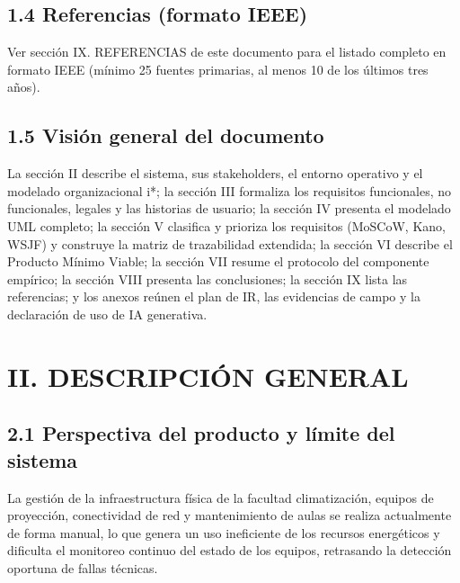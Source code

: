\subsection*{1.4 Referencias (formato IEEE)}


Ver sección IX. REFERENCIAS de este documento para el listado completo en formato IEEE (mínimo 25 fuentes primarias, al menos 10 de los últimos tres años).


\subsection*{1.5 Visión general del documento}


La sección II describe el sistema, sus stakeholders, el entorno operativo y el modelado organizacional i*; la sección III formaliza los requisitos funcionales, no funcionales, legales y las historias de usuario; la sección IV presenta el modelado UML completo; la sección V clasifica y prioriza los requisitos (MoSCoW, Kano, WSJF) y construye la matriz de trazabilidad extendida; la sección VI describe el Producto Mínimo Viable; la sección VII resume el protocolo del componente empírico; la sección VIII presenta las conclusiones; la sección IX lista las referencias; y los anexos reúnen el plan de IR, las evidencias de campo y la declaración de uso de IA generativa.


\section*{II. DESCRIPCIÓN GENERAL}


\subsection*{2.1 Perspectiva del producto y límite del sistema}


La gestión de la infraestructura física de la facultad climatización, equipos de proyección, conectividad de red y mantenimiento de aulas se realiza actualmente de forma manual, lo que genera un uso ineficiente de los recursos energéticos y dificulta el monitoreo continuo del estado de los equipos, retrasando la detección oportuna de fallas técnicas.


